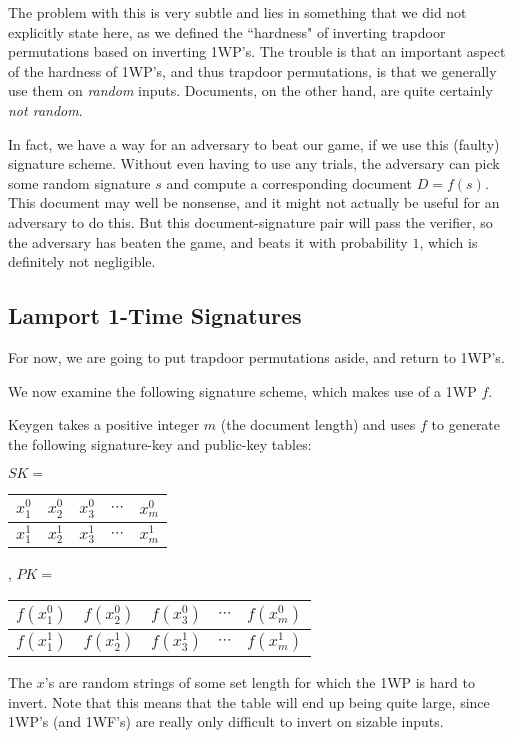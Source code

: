 \documentclass[11pt]{article}
\begin{document}
The problem with this is very subtle and lies in something that we did not explicitly state here, as we defined the ``hardness" of inverting trapdoor permutations based on inverting 1WP's. The trouble is that an important aspect of the hardness of 1WP's, and thus trapdoor permutations, is that we generally use them on \emph{random} inputs. Documents, on the other hand, are quite certainly \emph{not random}.\bigskip

In fact, we have a way for an adversary to beat our game, if we use this (faulty) signature scheme. Without even having to use any trials, the adversary can pick some random signature \(s\) and compute a corresponding document \(D=f(s)\). This document may well be nonsense, and it might not actually be useful for an adversary to do this. But this document-signature pair will pass the verifier, so the adversary has beaten the game, and beats it with probability \(1\), which is definitely not negligible.

\newpage
\subsection{Lamport 1-Time Signatures}
For now, we are going to put trapdoor permutations aside, and return to 1WP's.\medskip

We now examine the following signature scheme, which makes use of a 1WP \(f\).\bigskip

Keygen takes a positive integer \(m\) (the document length) and uses \(f\) to generate the following signature-key and public-key tables:

\begin{center}
\(SK=\)
\begin{tabular}{ |c|c|c|c|c| } 
 \hline
 \(x^0_1\) & \(x^0_2\) & \(x^0_3\) &\(\cdots\) & \(x^0_m\) \\ \hline
 \(x^1_1\) & \(x^1_2\) & \(x^1_3\) & \(\cdots\) & \(x^1_m\) \\ 
 \hline
\end{tabular},
\(PK=\)
\begin{tabular}{ |c|c|c|c|c| } 
 \hline
\( f(x^0_1)\) & \(f(x^0_2)\) & \(f(x^0_3)\) & \(\cdots \)& \(f(x^0_m)\) \\ \hline
\( f(x^1_1)\) & \(f(x^1_2)\) & \(f(x^1_3)\) &\( \cdots \)& \(f(x^1_m)\) \\ 
 \hline
\end{tabular}
\end{center}

The \(x\)'s are random strings of some set length for which the 1WP is hard to invert. Note that this means that the table will end up being quite large, since 1WP's (and 1WF's) are really only difficult to invert on sizable inputs.\bigskip
\end{document}
